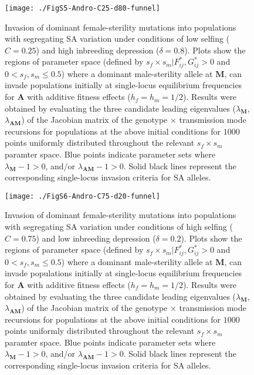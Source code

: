 \documentclass{article}
\begin{document}
\begin{figure}[ht!]
\centering
\texttt{[image: ./FigS5-Andro-C25-d80-funnel]}
\caption{Invasion of dominant female-sterility mutations into populations with segregating SA variation under conditions of low selfing ($C = 0.25$) and high inbreeding depression ($\delta = 0.8$). Plots show the regions of parameter space (defined by $s_f \times s_m | F^{\ast}_{ij},G^{\ast}_{ij} > 0$ and $0 < s_f,s_m \leq 0.5$) where a dominant male-sterility allele at $\mathbf{M}$, can invade populations initially at single-locus equilibrium frequencies for $\mathbf{A}$ with additive fitness effects ($h_f=h_m=1/2$). Results were obtained by evaluating the three candidate leading eigenvalues ($\lambda_{\mathbf{M}}$,$\lambda_{\mathbf{AM}}$) of the Jacobian matrix of the genotype $\times$ transmission mode recursions for populations at the above initial conditions for $1000$ points uniformly distributed throughout the relevant $s_f \times s_m$ paramter space. Blue points indicate parameter sets where $\lambda_{\mathbf{M}} - 1 > 0$, and/or $\lambda_{\mathbf{AM}} - 1 > 0$. Solid black lines represent the corresponding single-locus invasion criteria for SA alleles.}
\label{fig:AndC25d80Funnel}
\end{figure}
\newpage{}

\begin{figure}[ht!]
\centering
\texttt{[image: ./FigS6-Andro-C75-d20-funnel]}
\caption{Invasion of dominant female-sterility mutations into populations with segregating SA variation under conditions of high selfing ($C = 0.75$) and low inbreeding depression ($\delta = 0.2$). Plots show the regions of parameter space (defined by $s_f \times s_m | F^{\ast}_{ij},G^{\ast}_{ij} > 0$ and $0 < s_f,s_m \leq 0.5$) where a dominant male-sterility allele at $\mathbf{M}$, can invade populations initially at single-locus equilibrium frequencies for $\mathbf{A}$ with additive fitness effects ($h_f=h_m=1/2$). Results were obtained by evaluating the three candidate leading eigenvalues ($\lambda_{\mathbf{M}}$,$\lambda_{\mathbf{AM}}$) of the Jacobian matrix of the genotype $\times$ transmission mode recursions for populations at the above initial conditions for $1000$ points uniformly distributed throughout the relevant $s_f \times s_m$ paramter space. Blue points indicate parameter sets where $\lambda_{\mathbf{M}} - 1 > 0$, and/or $\lambda_{\mathbf{AM}} - 1 > 0$. Solid black lines represent the corresponding single-locus invasion criteria for SA alleles.}
\label{fig:AndC75d20Funnel}
\end{figure}
\newpage{}
\end{document}
